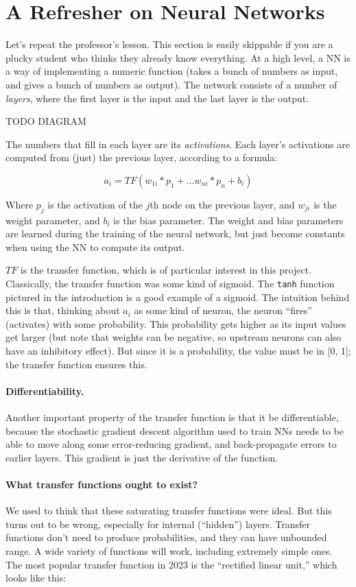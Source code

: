 \documentclass[twocolumn]{article}
\begin{document}
\section{A Refresher on Neural Networks}
Let's repeat the professor's lesson. This section is easily skippable
if you are a plucky student who thinks they already know everything.
At a high level, a NN is a way of implementing a numeric function
(takes a bunch of numbers as input, and gives a bunch of numbers as
output). The network consists of a number of {\it layers}, where the first
layer is the input and the last layer is the output.

TODO DIAGRAM

The numbers that fill in each layer are its {\it activations}. Each
layer's activations are computed from (just) the previous layer,
according to a formula:

$$a_i = TF(w_{1i} * p_1 + \ldots w_{ni} * p_n + b_i)$$

Where $p_j$ is the activation of the $j$th node on the previous layer,
and $w_{ji}$ is the weight parameter, and $b_i$ is the bias parameter.
The weight and bias parameters are learned during the training of the
neural network, but just become constants when using the NN to compute
its output.

$TF$ is the transfer function, which is of particular interest in this
project. Classically, the transfer function was some kind of sigmoid.
The {\tt tanh} function pictured in the introduction is a good example
of a sigmoid. The intuition behind this is that, thinking about $a_i$
as some kind of neuron, the neuron ``fires'' (activates) with some
probability. This probability gets higher as its input values get
larger (but note that weights can be negative, so upstream neurons can
also have an inhibitory effect). But since it is a probability, the
value must be in [0, 1]; the transfer function ensures this.

\paragraph{Differentiability.}
Another important property of the transfer function is that it be
differentiable, because the stochastic gradient descent algorithm used
to train NNs needs to be able to move along some error-reducing
gradient, and back-propagate errors to earlier layers. This gradient
is just the derivative of the function.

\paragraph{What transfer functions ought to exist?}
We used to think that these saturating transfer functions were ideal.
But this turns out to be wrong, especially for internal (``hidden'')
layers. Transfer functions don't need to produce probabilities, and
they can have unbounded range. A wide variety of functions will work,
including extremely simple ones. The most popular transfer function in
2023 is the ``rectified linear unit,'' which looks like this:
\end{document}
